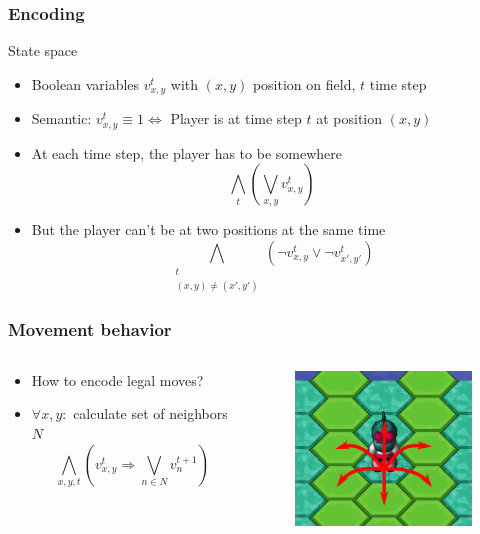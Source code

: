 \begin{frame}
	\frametitle{Encoding}
	\begin{block}{State space}
		\begin{itemize}	
			\item Boolean variables $v_{x,y}^{t}$ with $(x,y)$ position on field, $t$ time step
			\item Semantic: $v_{x,y}^{t} \equiv 1 \Leftrightarrow$ Player is at time step $t$ at position $(x,y)$
		\end{itemize}
	\end{block}

	\pause

	\begin{itemize}
		\item At each time step, the player has to be somewhere
			  \begin{displaymath}
			  \bigwedge \limits_t (\bigvee \limits_{x, y} v_{x,y}^{t})
			  \end{displaymath}
		\pause
		\item But the player can't be at two positions at the same time
			  \begin{displaymath}
			  \bigwedge \limits_{\substack{t\\ {(x, y) \not= (x', y')}}}
			  (\neg v_{x,y}^{t} \vee \neg v_{x',y'}^{t})
			  \end{displaymath}
	\end{itemize}
\end{frame}

\begin{frame}
	\frametitle{Movement behavior}
	\begin{columns}
		\begin{column}{6cm}
			\begin{itemize}
				\item How to encode legal moves?
				\item<2-> $\forall x,y:$ calculate set of neighbors $N$
				\begin{displaymath}
					\bigwedge_{x,y,t} (v_{x,y}^t \Rightarrow \bigvee_{n\in N} v_{n}^{t+1})
				\end{displaymath}
			\end{itemize}
		\end{column}
		\begin{column}{5cm}
			\begin{figure}
				\centering
				\includegraphics[width=5cm]{images/movement.png}
			\end{figure}
		\end{column}
	\end{columns}
\end{frame}

